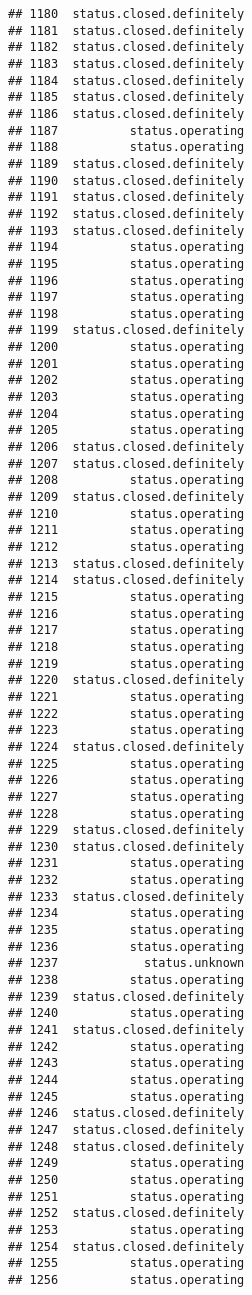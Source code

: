 \documentclass[
]{article}
\begin{document}
\begin{verbatim}
## 1180  status.closed.definitely
## 1181  status.closed.definitely
## 1182  status.closed.definitely
## 1183  status.closed.definitely
## 1184  status.closed.definitely
## 1185  status.closed.definitely
## 1186  status.closed.definitely
## 1187          status.operating
## 1188          status.operating
## 1189  status.closed.definitely
## 1190  status.closed.definitely
## 1191  status.closed.definitely
## 1192  status.closed.definitely
## 1193  status.closed.definitely
## 1194          status.operating
## 1195          status.operating
## 1196          status.operating
## 1197          status.operating
## 1198          status.operating
## 1199  status.closed.definitely
## 1200          status.operating
## 1201          status.operating
## 1202          status.operating
## 1203          status.operating
## 1204          status.operating
## 1205          status.operating
## 1206  status.closed.definitely
## 1207  status.closed.definitely
## 1208          status.operating
## 1209  status.closed.definitely
## 1210          status.operating
## 1211          status.operating
## 1212          status.operating
## 1213  status.closed.definitely
## 1214  status.closed.definitely
## 1215          status.operating
## 1216          status.operating
## 1217          status.operating
## 1218          status.operating
## 1219          status.operating
## 1220  status.closed.definitely
## 1221          status.operating
## 1222          status.operating
## 1223          status.operating
## 1224  status.closed.definitely
## 1225          status.operating
## 1226          status.operating
## 1227          status.operating
## 1228          status.operating
## 1229  status.closed.definitely
## 1230  status.closed.definitely
## 1231          status.operating
## 1232          status.operating
## 1233  status.closed.definitely
## 1234          status.operating
## 1235          status.operating
## 1236          status.operating
## 1237            status.unknown
## 1238          status.operating
## 1239  status.closed.definitely
## 1240          status.operating
## 1241  status.closed.definitely
## 1242          status.operating
## 1243          status.operating
## 1244          status.operating
## 1245          status.operating
## 1246  status.closed.definitely
## 1247  status.closed.definitely
## 1248  status.closed.definitely
## 1249          status.operating
## 1250          status.operating
## 1251          status.operating
## 1252  status.closed.definitely
## 1253          status.operating
## 1254  status.closed.definitely
## 1255          status.operating
## 1256          status.operating

\end{verbatim}
\end{document}
